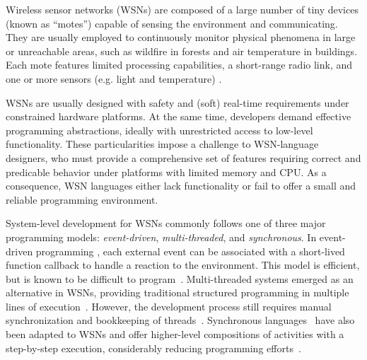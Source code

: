 \begin{comment}
System-level development for WSNs basically consists of abstracting access to 
the hardware and designing specially tweaked network protocols to be further 
integrated as services in higher-level applications or macro-programming 
systems~\cite{wsn.state_of_art,wsn.tos,wsn.survey}.

Our design is first compromised with the main principles that govern WSN 
development: \emph{resource minimization} and \emph{bug prevention}, as defined 
by Levis~\cite{wsn.decade}.

\end{comment}

Wireless sensor networks (WSNs) are composed of a large number of tiny devices 
(known as ``motes'') capable of sensing the environment and communicating.
They are usually employed to continuously monitor physical phenomena in large 
or unreachable areas, such as wildfire in forests and air temperature in 
buildings.
Each mote features limited processing capabilities, a short-range radio link, 
and one or more sensors (e.g. light and temperature) \cite{wsn.survey}.

WSNs are usually designed with safety and (soft) real-time requirements under 
constrained hardware platforms.
At the same time, developers demand effective programming abstractions, ideally 
with unrestricted access to low-level functionality.
%
These particularities impose a challenge to WSN-language designers, who must 
provide a comprehensive set of features requiring correct and predicable 
behavior under platforms with limited memory and CPU.
As a consequence, WSN languages either lack functionality or fail to offer a 
small and reliable programming environment.

System-level development for WSNs commonly follows one of three major 
programming models: \emph{event-driven}, \emph{multi-threaded}, and 
\emph{synchronous}.
%
In event-driven programming \cite{wsn.tos,wsn.contiki}, each external event can 
be associated with a short-lived function callback to handle a reaction to the 
environment.
This model is efficient,
but is known to be difficult to 
program~\cite{sync_async.cooperative,wsn.protothreads}.
%
Multi-threaded systems emerged as an alternative in WSNs, providing traditional 
structured programming in multiple lines of 
execution~\cite{wsn.protothreads,wsn.mantisos}.
However, the development process still requires manual synchronization and 
bookkeeping of threads~\cite{sync_async.threadsproblems}.
%
Synchronous languages~\cite{rp.twelve} have also been adapted to WSNs and offer 
higher-level compositions of activities with a step-by-step execution, 
considerably reducing programming efforts~\cite{wsn.sol,wsn.osm}.

